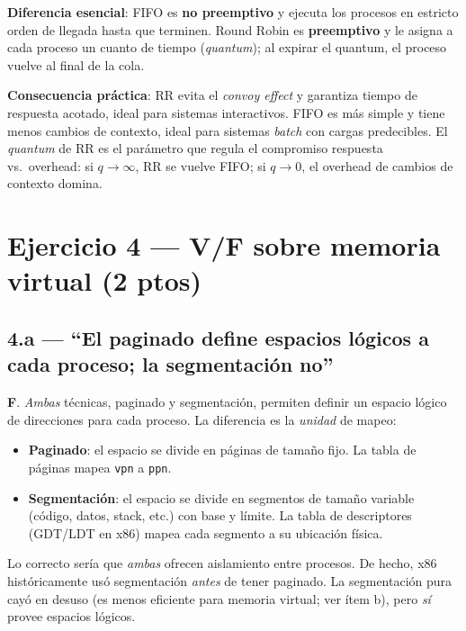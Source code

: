 \documentclass[11pt,a4paper]{article}
\begin{document}
\begin{respuesta}
\textbf{Diferencia esencial}: FIFO es \textbf{no preemptivo} y
ejecuta los procesos en estricto orden de llegada hasta que
terminen. Round Robin es \textbf{preemptivo} y le asigna a cada
proceso un cuanto de tiempo (\emph{quantum}); al expirar el
quantum, el proceso vuelve al final de la cola.

\textbf{Consecuencia práctica}: RR evita el \emph{convoy effect} y
garantiza tiempo de respuesta acotado, ideal para sistemas
interactivos. FIFO es más simple y tiene menos cambios de contexto,
ideal para sistemas \emph{batch} con cargas predecibles. El
\emph{quantum} de RR es el parámetro que regula el compromiso
respuesta vs.\ overhead: si $q \to \infty$, RR se vuelve FIFO; si
$q \to 0$, el overhead de cambios de contexto domina.
\end{respuesta}

\section{Ejercicio 4 --- V/F sobre memoria virtual (2 ptos)}

\subsection*{4.a --- ``El paginado define espacios lógicos a cada proceso; la segmentación no''}

\begin{respuesta}
\textbf{F}. \emph{Ambas} técnicas, paginado y segmentación,
permiten definir un espacio lógico de direcciones para cada proceso.
La diferencia es la \emph{unidad} de mapeo:

\begin{itemize}[leftmargin=*,nosep]
    \item \textbf{Paginado}: el espacio se divide en páginas de
        tamaño fijo. La tabla de páginas mapea \texttt{vpn} a
        \texttt{ppn}.
    \item \textbf{Segmentación}: el espacio se divide en segmentos
        de tamaño variable (código, datos, stack, etc.) con base y
        límite. La tabla de descriptores (GDT/LDT en x86) mapea
        cada segmento a su ubicación física.
\end{itemize}

Lo correcto sería que \emph{ambas} ofrecen aislamiento entre
procesos. De hecho, x86 históricamente usó segmentación
\emph{antes} de tener paginado. La segmentación pura cayó en
desuso (es menos eficiente para memoria virtual; ver ítem b), pero
\emph{sí} provee espacios lógicos.
\end{respuesta}
\end{document}
